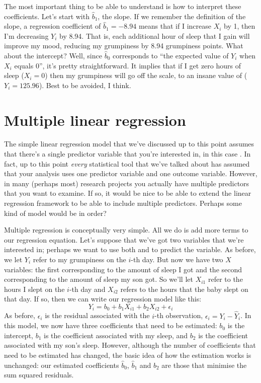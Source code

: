 
The most important thing to be able to understand is how to interpret these coefficients. Let's start with $\hat{b}_1$, the slope. If we remember the definition of the slope, a regression coefficient of $\hat{b}_1 = -8.94$ means that if I increase $X_i$ by 1, then I'm decreasing $Y_i$ by 8.94. That is, each additional hour of sleep that I gain will improve my mood, reducing my grumpiness by 8.94 grumpiness points. What about the intercept? Well, since $\hat{b}_0$ corresponds to ``the expected value of $Y_i$ when $X_i$ equals 0'', it's pretty straightforward. It implies that if I get zero hours of sleep ($X_i =0$) then my grumpiness will go off the scale, to an insane value of ($Y_i = 125.96$). Best to be avoided, I think.


\section{Multiple linear regression~\label{sec:multipleregression}}

The simple linear regression model that we've discussed up to this point assumes that there's a single predictor variable that you're interested in, in this case . In fact, up to this point {\it every} statistical tool that we've talked about has assumed that your analysis uses one predictor variable and one outcome variable. However, in many (perhaps most) research projects you actually have multiple predictors that you want to examine. If so, it would be nice to be able to extend the linear regression framework to be able to include multiple predictors. Perhaps some kind of  model would be in order?

Multiple regression is conceptually very simple. All we do is add more terms to our regression equation. Let's suppose that we've got two variables that we're interested in; perhaps we want to use both  and  to predict the  variable. As before, we let $Y_i$ refer to my grumpiness on the $i$-th day. But now we have two $X$ variables: the first corresponding to the amount of sleep I got and the second corresponding to the amount of sleep my son got. So we'll let $X_{i1}$ refer to the hours I slept on the $i$-th day and $X_{i2}$ refers to the hours that the baby slept on that day. If so, then we can write our regression model like this:
$$
Y_i = b_0 + b_1 X_{i1} + b_2 X_{i2} + \epsilon_i
$$
As before, $\epsilon_i$ is the residual associated with the $i$-th observation, $\epsilon_i = {Y}_i - \hat{Y}_i$. In this model, we now have three coefficients that need to be estimated: $b_0$ is the intercept, $b_1$ is the coefficient associated with my sleep, and $b_2$ is the coefficient associated with my son's sleep. However, although the number of coefficients that need to be estimated has changed, the basic idea of how the estimation works is unchanged: our estimated coefficients $\hat{b}_0$, $\hat{b}_1$ and $\hat{b}_2$ are those that minimise the sum squared residuals. 

